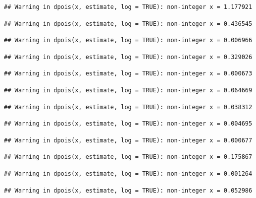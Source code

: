 \documentclass[]{article}
\begin{document}
\begin{verbatim}
## Warning in dpois(x, estimate, log = TRUE): non-integer x = 1.177921
\end{verbatim}

\begin{verbatim}
## Warning in dpois(x, estimate, log = TRUE): non-integer x = 0.436545
\end{verbatim}

\begin{verbatim}
## Warning in dpois(x, estimate, log = TRUE): non-integer x = 0.006966
\end{verbatim}

\begin{verbatim}
## Warning in dpois(x, estimate, log = TRUE): non-integer x = 0.329026
\end{verbatim}

\begin{verbatim}
## Warning in dpois(x, estimate, log = TRUE): non-integer x = 0.000673
\end{verbatim}

\begin{verbatim}
## Warning in dpois(x, estimate, log = TRUE): non-integer x = 0.064669
\end{verbatim}

\begin{verbatim}
## Warning in dpois(x, estimate, log = TRUE): non-integer x = 0.038312
\end{verbatim}

\begin{verbatim}
## Warning in dpois(x, estimate, log = TRUE): non-integer x = 0.004695
\end{verbatim}

\begin{verbatim}
## Warning in dpois(x, estimate, log = TRUE): non-integer x = 0.000677
\end{verbatim}

\begin{verbatim}
## Warning in dpois(x, estimate, log = TRUE): non-integer x = 0.175867
\end{verbatim}

\begin{verbatim}
## Warning in dpois(x, estimate, log = TRUE): non-integer x = 0.001264
\end{verbatim}

\begin{verbatim}
## Warning in dpois(x, estimate, log = TRUE): non-integer x = 0.052986
\end{verbatim}
\end{document}
